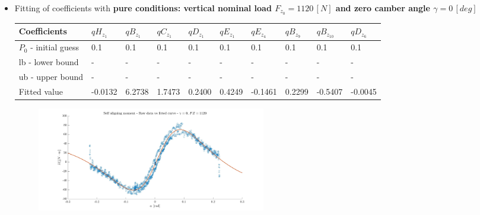 \documentclass{IEEEtran}
\begin{document}
        \begin{itemize}
            \item Fitting of coefficients with \textbf{pure conditions:  vertical nominal load $F_{z_0} = 1120 \, [N]$ and zero camber angle $\gamma = 0 \, [deg]$}  \\
        
                \begin{table}[htbp]
                    \begin{adjustbox}{width=\columnwidth,center}
                        \begin{tabular}{|l|l|l|l|l|l|l|l|l|l|}  
                            \hline
                            Coefficients & $qH_{z_1}$ & $qB_{z_1}$ & $qC_{z_1}$ & $qD_{z_1}$ & $qE_{z_1}$ & $qE_{z_4}$ &
                            $qB_{z_9}$ & $qB_{z_{10}}$ & $qD_{z_6}$ \\
                            \hline
                            $P_0$ - initial guess & 0.1 & 0.1 & 0.1 & 0.1 & 0.1 & 0.1 & 0.1 & 0.1 & 0.1 \\ \hline
                            lb - lower bound   & - & - & - & - & - & - & - & - & - \\ 
                            \hline
                            ub - upper bound   & - & - & - & - & - & - & - & - & - \\ 
                            \hline
                            Fitted value & -0.0132 & 6.2738 & 1.7473 & 0.2400 & 0.4249 & -0.1461 & 0.2299 & -0.5407 & -0.0045 \\
                            \hline
                        \end{tabular}
                    \end{adjustbox}
                \end{table}
            
                \begin{figure}[htbp]
                    \centerline{\includegraphics[width = 3.95in]{moment_1.jpg}}
                    \label{fig:MZ_nom}
                \end{figure}


\end{itemize}
\end{document}
